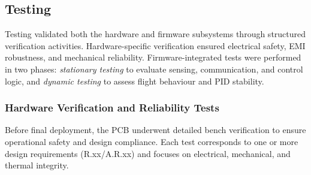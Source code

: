 \subsection{Testing}

Testing validated both the hardware and firmware subsystems through structured verification activities. Hardware-specific verification ensured electrical safety, EMI robustness, and mechanical reliability. Firmware-integrated tests were performed in two phases: \textit{stationary testing} to evaluate sensing, communication, and control logic, and \textit{dynamic testing} to assess flight behaviour and PID stability. 

\subsubsection{Hardware Verification and Reliability Tests}

Before final deployment, the PCB underwent detailed bench verification to ensure operational safety and design compliance. Each test corresponds to one or more design requirements (R.xx/A.R.xx) and focuses on electrical, mechanical, and thermal integrity.

